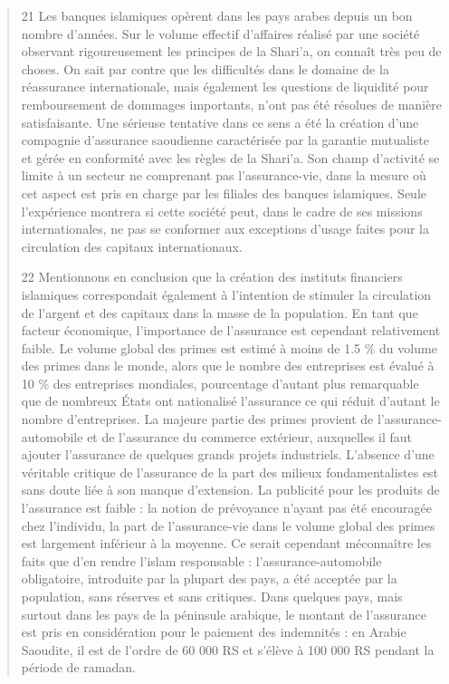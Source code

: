 \begin{quote}
21 Les banques islamiques opèrent dans les pays arabes depuis un bon nombre d’années. Sur le volume effectif d’affaires réalisé par une société observant rigoureusement les principes de la Shari’a, on connaît très peu de choses. On sait par contre que les difficultés dans le domaine de la réassurance internationale, mais également les questions de liquidité pour remboursement de dommages importants, n’ont pas été résolues de manière satisfaisante. Une sérieuse tentative dans ce sens a été la création d’une compagnie d’assurance saoudienne caractérisée par la garantie mutualiste et gérée en conformité avec les règles de la Shari’a. Son champ d’activité se limite à un secteur ne comprenant pas l’assurance-vie, dans la mesure où cet aspect est pris en charge par les filiales des banques islamiques. Seule l’expérience montrera si cette société peut, dans le cadre de ses missions internationales, ne pas se conformer aux exceptions d’usage faites pour la circulation des capitaux internationaux.
 

22 Mentionnons en conclusion que la création des instituts financiers islamiques correspondait également à l’intention de stimuler la circulation de l’argent et des capitaux dans la masse de la population. En tant que facteur économique, l’importance de l’assurance est cependant relativement faible. Le volume global des primes est estimé à moins de 1.5 \% du volume des primes dans le monde, alors que le nombre des entreprises est évalué à 10 \% des entreprises mondiales, pourcentage d’autant plus remarquable que de nombreux États ont nationalisé l’assurance ce qui réduit d’autant le nombre d’entreprises. La majeure partie des primes provient de l’assurance-automobile et de l’assurance du commerce extérieur, auxquelles il faut ajouter l’assurance de quelques grands projets industriels. L’absence d’une véritable critique de l’assurance de la part des milieux fondamentalistes est sans doute liée à son manque d’extension. La publicité pour les produits de l’assurance est faible : la notion de prévoyance n’ayant pas été encouragée chez l’individu, la part de l’assurance-vie dans le volume global des primes est largement inférieur à la moyenne. Ce serait cependant méconnaître les faits que d’en rendre l’islam responsable : l’assurance-automobile obligatoire, introduite par la plupart des pays, a été acceptée par la population, sans réserves et sans critiques. Dans quelques pays, mais surtout dans les pays de la péninsule arabique, le montant de l’assurance est pris en considération pour le paiement des indemnités : en Arabie Saoudite, il est de l’ordre de 60 000 RS et s’élève à 100 000 RS pendant la période de ramadan.


\end{quote}

